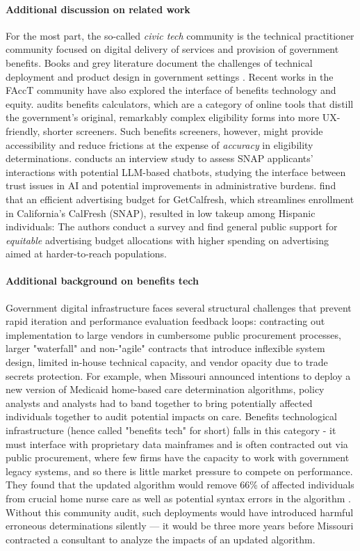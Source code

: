 \documentclass[manuscript,screen,authorversion]{acmart}
\begin{document}
\paragraph{Additional discussion on related work}
For the most part, the so-called \textit{civic tech} community is the technical practitioner community focused on digital delivery of services and provision of government benefits. Books and grey literature document the challenges of technical deployment and product design in government settings \citep{pahlka2023recoding}. Recent works in the FAccT community have also explored the interface of benefits technology and equity. \citet{escher2020exposing} audits benefits calculators, which are a category of online tools that distill the government's original, remarkably complex eligibility forms into more UX-friendly, shorter screeners. Such benefits screeners, however, might provide accessibility and reduce frictions at the expense of \textit{accuracy} in eligibility determinations. \citet{jo2025ai} conducts an interview study to assess SNAP applicants' interactions with potential LLM-based chatbots, studying the interface between trust issues in AI and potential improvements in administrative burdens. \citet{koenecke2023popular} find that an efficient advertising budget for GetCalfresh, which streamlines enrollment in California's CalFresh (SNAP), resulted in low takeup among Hispanic individuals: The authors conduct a survey and find general public support for \textit{equitable} advertising budget allocations with higher spending on advertising aimed at harder-to-reach populations.

\paragraph{Additional background on benefits tech}

Government digital infrastructure faces several structural challenges that prevent rapid iteration and performance evaluation feedback loops: contracting out implementation to large vendors in cumbersome public procurement processes, larger "waterfall" and non-"agile" contracts that introduce inflexible system design, limited in-house technical capacity, and vendor opacity due to trade secrets protection. For example, when Missouri announced intentions to deploy a new version of Medicaid home-based care determination algorithms, policy analysts and analysts had to band together to bring potentially affected individuals together to audit potential impacts on care. Benefits technological infrastructure (hence called "benefits tech" for short) falls in this category - it must interface with proprietary data mainframes and is often contracted out via public procurement, where few firms have the capacity to work with government legacy systems, and so there is little market pressure to compete on performance. They found that the updated algorithm would remove 66\% of affected individuals from crucial home nurse care as well as potential syntax errors in the algorithm \citep{noauthor_missouri_nodate}. Without this community audit, such deployments would have introduced harmful erroneous determinations silently --- it would be three more years before Missouri contracted a consultant to analyze the impacts of an updated algorithm. 
\end{document}
